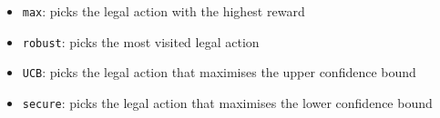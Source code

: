 \begin{enumerate}
  \begin{itemize}
    \item \texttt{max}: picks the legal action with the highest reward
    \item \texttt{robust}: picks the most visited legal action
    \item \texttt{UCB}: picks the legal action that maximises the upper confidence bound
    \item \texttt{secure}: picks the legal action that maximises the lower confidence bound
  \end{itemize}
\end{enumerate}





